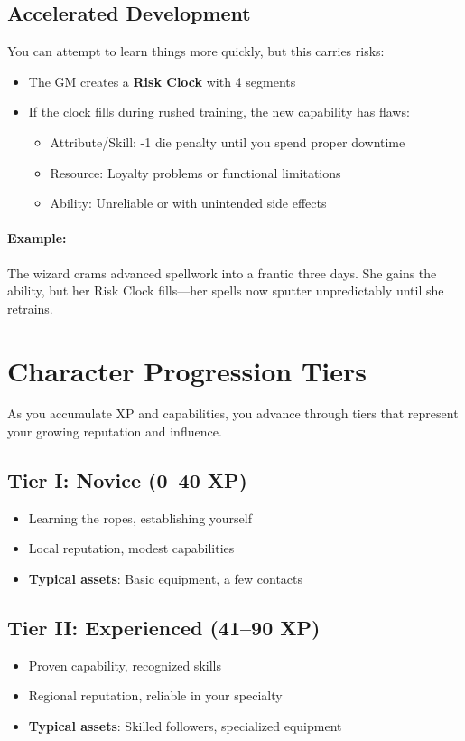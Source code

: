 \subsection*{Accelerated Development}
You can attempt to learn things more quickly, but this carries risks:

\begin{itemize}
\item The GM creates a \textbf{Risk Clock} with 4 segments
\item If the clock fills during rushed training, the new capability has flaws:
\begin{itemize}
\item Attribute/Skill: -1 die penalty until you spend proper downtime
\item Resource: Loyalty problems or functional limitations
\item Ability: Unreliable or with unintended side effects
\end{itemize}
\end{itemize}

\paragraph{Example:}  
The wizard crams advanced spellwork into a frantic three days. She gains the ability, but her Risk Clock fills—her spells now sputter unpredictably until she retrains.

\section{Character Progression Tiers}

As you accumulate XP and capabilities, you advance through tiers that represent your growing reputation and influence.

\subsection*{Tier I: Novice (0–40 XP)}
\begin{itemize}
\item Learning the ropes, establishing yourself
\item Local reputation, modest capabilities
\item \textbf{Typical assets}: Basic equipment, a few contacts
\end{itemize}

\subsection*{Tier II: Experienced (41–90 XP)}
\begin{itemize}
\item Proven capability, recognized skills
\item Regional reputation, reliable in your specialty
\item \textbf{Typical assets}: Skilled followers, specialized equipment
\end{itemize}

